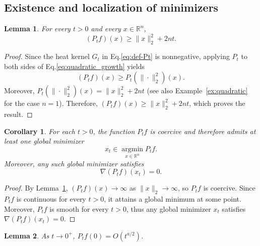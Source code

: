 \documentclass{article}
\newtheorem{lemma}[lemma]{Lemma}
\newtheorem{corollary}[corollary]{Corollary}
\begin{document}
\subsection{Existence and localization of minimizers}
\begin{lemma}\label{lem:gaussian-lower-bound}
For every $t>0$ and every $x\in\mathbb R^n$, $$(P_t f)(x)\ge \|x\|_2^2+2nt.$$ 
\end{lemma}

\begin{proof}
Since the heat kernel $G_t$ in Eq.\eqref{eq:def-Pt} is nonnegative, applying $P_t$ to both sides of Eq.\eqref{eq:quadratic_growth} yields
$$(P_t f)(x)\ge P_t(\|\cdot\|_2^2)(x).$$ 
Moreover, $P_t(\|\cdot\|_2^2)(x)=\|x\|_2^2+2nt$ (see also Example~\ref{ex:quadratic} for the case $n=1$). Therefore, $(P_t f)(x)\ge \|x\|_2^2+2nt$, which proves the result.
\end{proof}

\begin{corollary}
For each $t>0$, the function $P_t f$ is coercive and therefore admits at least one global minimizer
$$x_t\in \operatorname*{argmin}_{x\in\mathbb R^n} P_t f.$$
Moreover, any such global minimizer satisfies
$$\nabla(P_t f)(x_t)=0.$$
\end{corollary}

\begin{proof}
By Lemma~\ref{lem:gaussian-lower-bound}, $(P_t f)(x)\to\infty$ as $\|x\|_2\to\infty$, so $P_t f$ is coercive. Since $P_t f$ is continuous for every $t>0$, it attains a global minimum at some point. Moreover, $P_t f$ is smooth for every $t>0$, thus any global minimizer $x_t$ satisfies $\nabla(P_t f)(x_t)=0$.
\end{proof}

\begin{lemma}\label{lem:Ptf0-estimate}
As $t\to0^+$, $P_t f(0)=O(t^{a/2})$.
\end{lemma}
\end{document}
